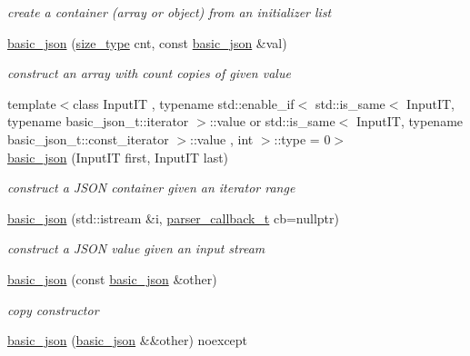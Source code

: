 \begin{DoxyCompactItemize}
\begin{DoxyCompactList}\small\item\em create a container (array or object) from an initializer list \end{DoxyCompactList}\item 
\hyperlink{a00025_a112a2d8e76345ea64f71e2985fee4c52}{basic\+\_\+json} (\hyperlink{a00025_a1579a8f72a230358d6cd1a6e8a62859b}{size\+\_\+type} cnt, const \hyperlink{a00025}{basic\+\_\+json} \&val)
\begin{DoxyCompactList}\small\item\em construct an array with count copies of given value \end{DoxyCompactList}\item 
{\footnotesize template$<$class Input\+IT , typename std\+::enable\+\_\+if$<$                                                                  std\+::is\+\_\+same$<$ Input\+I\+T, typename basic\+\_\+json\+\_\+t\+::iterator $>$\+::value or                                                               std\+::is\+\_\+same$<$ Input\+I\+T, typename basic\+\_\+json\+\_\+t\+::const\+\_\+iterator $>$\+::value                                                               , int $>$\+::type  = 0$>$ }\\\hyperlink{a00025_af7acf3838a79363356f24538941a559c}{basic\+\_\+json} (Input\+IT first, Input\+IT last)
\begin{DoxyCompactList}\small\item\em construct a J\+S\+ON container given an iterator range \end{DoxyCompactList}\item 
\hyperlink{a00025_a9857835334d38ba04959e348ca6be208}{basic\+\_\+json} (std\+::istream \&i, \hyperlink{a00025_a9e35475e2027520a78e09f460dbe048a}{parser\+\_\+callback\+\_\+t} cb=nullptr)
\begin{DoxyCompactList}\small\item\em construct a J\+S\+ON value given an input stream \end{DoxyCompactList}\item 
\hyperlink{a00025_a4ab93491f82545342562c7ee7e3166c7}{basic\+\_\+json} (const \hyperlink{a00025}{basic\+\_\+json} \&other)
\begin{DoxyCompactList}\small\item\em copy constructor \end{DoxyCompactList}\item 
\hyperlink{a00025_a73e150cbcba5643cb89de8f515eb64e2}{basic\+\_\+json} (\hyperlink{a00025}{basic\+\_\+json} \&\&other) noexcept

\end{DoxyCompactItemize}
